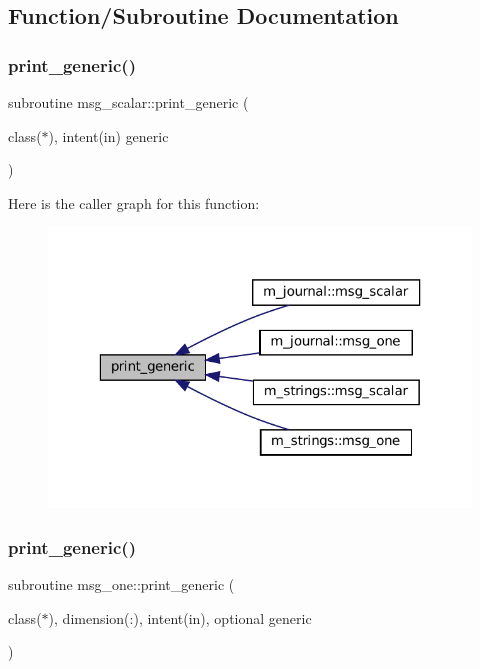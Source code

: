 \subsection{Function/\+Subroutine Documentation}
\mbox{\label{M__journal_8f90_aaa8ee15f943d8e1543ae35ab732c3cd2}} 
\subsubsection{\texorpdfstring{print\+\_\+generic()}{print\_generic()}\hspace{0.1cm}{\footnotesize\ttfamily [1/2]}}
{\footnotesize\ttfamily subroutine msg\+\_\+scalar\+::print\+\_\+generic (\begin{DoxyParamCaption}\item[{class($\ast$), intent(in)}]{generic }\end{DoxyParamCaption})\hspace{0.3cm}{\ttfamily [private]}}

Here is the caller graph for this function\+:
\nopagebreak
\begin{figure}[H]
\begin{center}
\leavevmode
\includegraphics[width=323pt]{M__journal_8f90_aaa8ee15f943d8e1543ae35ab732c3cd2_icgraph}
\end{center}
\end{figure}
\mbox{\label{M__journal_8f90_a9d5e1620d474ac03a74eeb9b0f7d6ae1}} 
\subsubsection{\texorpdfstring{print\+\_\+generic()}{print\_generic()}\hspace{0.1cm}{\footnotesize\ttfamily [2/2]}}
{\footnotesize\ttfamily subroutine msg\+\_\+one\+::print\+\_\+generic (\begin{DoxyParamCaption}\item[{class($\ast$), dimension(\+:), intent(in), optional}]{generic }\end{DoxyParamCaption})\hspace{0.3cm}{\ttfamily [private]}}


